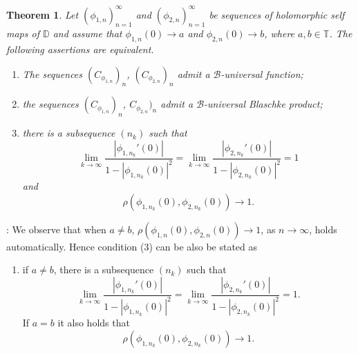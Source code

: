 \documentclass[12pt,a4paper]{amsart}
\theoremstyle{plain}
\newtheorem{theorem}{Theorem}[section]
\theoremstyle{definition}
\theoremstyle{remark}
\theoremstyle{fact}
\newenvironment{rem}
{ \noindent {\it Remark\/}: }
{\null \hfill \par\medskip}
\begin{document}
    \begin{theorem}\label{Blaschke}
        Let $(\phi_{1, n})_{n=1}^{\infty}$ and $(\phi_{2, n})_{n=1}^{\infty}$ be sequences of holomorphic self maps of $\mathbb{D}$ and assume that $\phi_{1, n}(0)\rightarrow a$ and $\phi_{2, n}(0)\rightarrow b$, where $a, b\in \mathbb{T}$. The following assertions are equivalent.
        \begin{enumerate}
            \item The sequences $(C_{\phi_{1, n}})_n$, $(C_{\phi_{2, n}})_n$ admit a $\mathcal{B}$-universal function; 
            \item the sequences $(C_{\phi_{1, n}})_n$, $C_{\phi_{2, n}})_n$ admit a $\mathcal{B}$-universal Blaschke product;
            \item there is a subsequence $(n_k)$ such that
            $$
            \lim_{k\rightarrow \infty}\frac{|\phi_{1, n_k}'(0)|}{1-|\phi_{1, n_k}(0)|^2}=\lim_{k\rightarrow \infty}\frac{|\phi_{2, n_k}'(0)|}{1-|\phi_{2, n_k}(0)|^2}=1
            $$
            and
            $$
            \rho(\phi_{1, n_k}(0),\phi_{2, n_k}(0))\rightarrow 1.
            $$
            \end{enumerate}
    \end{theorem}


    \begin{rem}
        We observe that when $a\neq b$, $\rho(\phi_{1, n}(0),\phi_{2, n}(0))\rightarrow 1$, as $n\rightarrow \infty$, holds automatically. Hence condition (3) can be also be stated as
        \begin{enumerate}
            \item[($3$)] if $a\neq b$, there is a subsequence $(n_k)$ such that
            $$
            \lim_{k\rightarrow \infty}\frac{|\phi_{1, n_k}'(0)|}{1-|\phi_{1, n_k}(0)|^2}=\lim_{k\rightarrow \infty}\frac{|\phi_{2, n_k}'(0)|}{1-|\phi_{2, n_k}(0)|^2}=1.
            $$
            If $a=b$ it also holds that
            $$
            \rho(\phi_{1, n_k}(0),\phi_{2, n_k}(0))\rightarrow 1.
            $$
        \end{enumerate}
    \end{rem}
\end{document}
